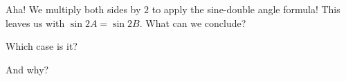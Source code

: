 


Aha! We multiply both sides by $2$ to apply the sine-double angle formula! This leaves us with $\sin 2A = \sin 2B.$ What can we conclude?



Which case is it?

And why?












